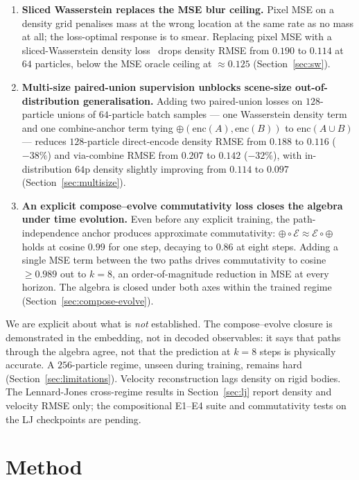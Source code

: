 \documentclass[11pt]{article}
\newcommand{\enc}{\mathrm{enc}}
\newcommand{\combine}{\oplus}
\newcommand{\evolve}{\mathcal{E}}
\begin{document}
\begin{enumerate}[leftmargin=*, itemsep=2pt, topsep=2pt]
  \item \textbf{Sliced Wasserstein replaces the MSE blur ceiling.} Pixel MSE on a density grid penalises mass at the wrong location at the same rate as no mass at all; the loss-optimal response is to smear. Replacing pixel MSE with a sliced-Wasserstein density loss~\cite{rabin2011wasserstein, kolouri2019sliced} drops density RMSE from $0.190$ to $0.114$ at $64$ particles, below the MSE oracle ceiling at $\approx 0.125$ (Section~\ref{sec:sw}).
  \item \textbf{Multi-size paired-union supervision unblocks scene-size out-of-distribution generalisation.} Adding two paired-union losses on $128$-particle unions of $64$-particle batch samples --- one Wasserstein density term and one combine-anchor term tying $\combine(\enc(A), \enc(B))$ to $\enc(A \cup B)$ --- reduces $128$-particle direct-encode density RMSE from $0.188$ to $0.116$ ($-38\%$) and via-combine RMSE from $0.207$ to $0.142$ ($-32\%$), with in-distribution $64$p density slightly improving from $0.114$ to $0.097$ (Section~\ref{sec:multisize}).
  \item \textbf{An explicit compose--evolve commutativity loss closes the algebra under time evolution.} Even before any explicit training, the path-independence anchor produces approximate commutativity: $\combine \circ \evolve \approx \evolve \circ \combine$ holds at cosine $0.99$ for one step, decaying to $0.86$ at eight steps. Adding a single MSE term between the two paths drives commutativity to cosine $\ge 0.989$ out to $k = 8$, an order-of-magnitude reduction in MSE at every horizon. The algebra is closed under both axes within the trained regime (Section~\ref{sec:compose-evolve}).
\end{enumerate}

We are explicit about what is \emph{not} established. The compose--evolve closure is demonstrated in the embedding, not in decoded observables: it says that paths through the algebra agree, not that the prediction at $k = 8$ steps is physically accurate. A $256$-particle regime, unseen during training, remains hard (Section~\ref{sec:limitations}). Velocity reconstruction lags density on rigid bodies. The Lennard-Jones cross-regime results in Section~\ref{sec:lj} report density and velocity RMSE only; the compositional E1--E4 suite and commutativity tests on the LJ checkpoints are pending.

\section{Method}
\label{sec:method}
\end{document}
